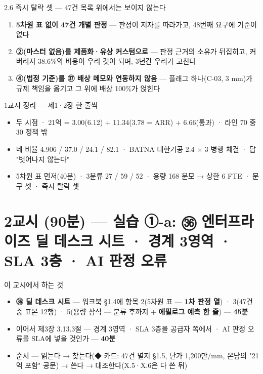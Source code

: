\begin{frame}{2.6 즉시 탈락 셋 — 47건 목록 위에서는 보이지 않는다}
\begin{enumerate}
\item \textbf{5차원 표 없이 47건 개별 판정} — 판정이 저자를 따라가고, 48번째 요구에 기준이 없다
\item \textbf{②(마스터 없음)를 제품화·유상 커스텀으로} — 판정 근거의 소유가 뒤집히고, 커버리지 38.6\%의 비용이 우리 것이 되며, 3년간 우리가 고친다
\item \textbf{④(법정 기준)를 ㊲ 배상 메모와 연동하지 않음} — 플래그 하나(C-03, 3 mm)가 규제 책임을 옮기고 그 위에 배상 100\%가 얹힌다
\end{enumerate}
\end{frame}

\begin{frame}{1교시 정리 — 제1·2장 한 줄씩}
\begin{itemize}
\item 두 시점 · 21억 = 3.00(6.12) + 11.34(3.78 = ARR) + 6.66(통과) · 라인 70 중 30 정책 밖
\item 네 비율 4.906 / 37.0 / 24.1 / 82.1 · BATNA 대한기공 2.4 × 3 병행 체결 · 답 "벗어나지 않는다"
\item 5차원 표 먼저(40분) · 3분류 27 / 59 / 52 · 용량 168 분모 → 상한 6 FTE · 문구 셋 · 즉시 탈락 셋
\end{itemize}
\end{frame}

\section{2교시 (90분) — 실습 ①-a: ㊱ 엔터프라이즈 딜 데스크 시트 · 경계 3영역 · SLA 3층 · AI 판정 오류}
\begin{frame}{이 교시에서 하는 것}
\begin{itemize}
\item \textbf{㊱ 딜 데스크 시트} — 워크북 §1.4에 항목 2(5차원 표 — \textbf{1차 판정 열}) · 3(47건 중 표본 12행) · 5(용량 잠식 — 분류 후까지 + \textbf{에필로그 예측 한 줄}) — \textbf{45분}
\item 이어서 제3장 3.1\til{}3.3절 — 경계 3영역 · SLA 3층을 공급자 쪽에서 · AI 판정 오류를 SLA에 넣을 것인가 — \textbf{40분}
\item 순서 — 읽는다 → 찾는다(◆ 카드: 47건 별지 §1.5, 단가 1,200만/mm, 온담의 "21억 포함" 공문) → 쓴다 → 대조한다(X.5·X.6은 다 쓴 뒤)
\end{itemize}
\end{frame}

